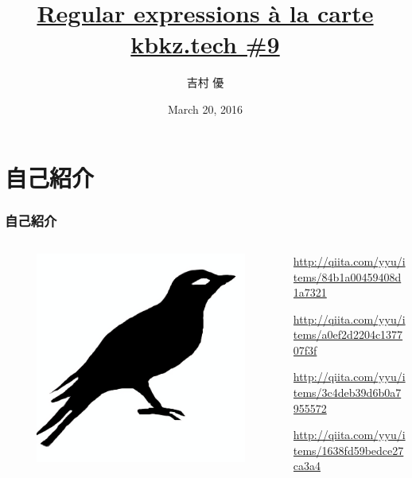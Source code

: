 \documentclass[12pt, unicode, svgnames]{beamer}
\title[Regular expressions à la carte]{%
  \href{https://github.com/y-yu/regex-slide}{Regular expressions à la carte} \\
  \href{http://kbkz.connpass.com/event/26677/}{\normalsize kbkz.tech \#9}
}
\author{吉村 優}
\date{March 20, 2016}
\institute[\url{https://twitter.com/\_yyu\_}]{%
  \url{https://twitter.com/\_yyu\_}\\
  \url{http://qiita.com/yyu}\\
  \url{https://github.com/y-yu}\\
}
\begin{document}
\frame{\maketitle}

\section{自己紹介}
\begin{frame}[fragile]
  \frametitle{自己紹介}
  
  \begin{columns}
    \begin{column}{0.3\textwidth}
      \centering
      \begin{figure}
        \includegraphics[width=.7\textwidth]{img/bird2x.png}
      \end{figure}
    \end{column}
    \begin{column}{0.7\textwidth}
      \begin{Ldescription}
        \small
        \item<2->[VM型の正規表現エンジンを実装する]
          \url{http://qiita.com/yyu/items/84b1a00459408d1a7321}
        \item<3->[正規表現からLLVMへのコンパイラを実装する]
          \url{http://qiita.com/yyu/items/a0ef2d2204c137707f3f}
        \item<4->[正規表現のJITコンパイラを実装する]
          \url{http://qiita.com/yyu/items/3c4deb39d6b0a7955572}
        \item<5->[正規表現の微分でサブマッチング]
          \url{http://qiita.com/yyu/items/1638fd59bedce27ca3a4}
      \end{Ldescription}
    \end{column}
  \end{columns}
\end{frame}
\end{document}
